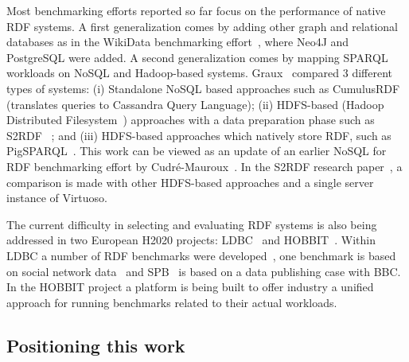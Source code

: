 Most benchmarking efforts reported so far focus on the performance of native RDF systems. A first generalization comes by adding other graph and relational databases as in the WikiData benchmarking effort~\cite{hernandez2016querying}, where Neo4J and PostgreSQL were added. A second generalization comes by mapping SPARQL workloads on NoSQL and Hadoop-based systems. Graux~\cite{graux2016multi} compared 3 different types of systems: (i) Standalone NoSQL based approaches such as CumulusRDF~\cite{ladwig2011cumulusrdf} (translates queries to Cassandra Query Language); (ii) HDFS-based (Hadoop Distributed Filesystem~\cite{ghemawat2003google}) approaches with a data preparation phase such as S2RDF~\cite{Schatzle:2016:SRQ:2977797.2977806} ; and (iii) HDFS-based approaches which natively store RDF, such as PigSPARQL~\cite{schatzle2011pigsparql}. This work can be viewed as an update of an earlier NoSQL for RDF benchmarking effort by Cudr{\'e}-Mauroux~\cite{cudre2013nosql}. 
In the S2RDF research paper~\cite{Schatzle:2016:SRQ:2977797.2977806}, a comparison is made with other HDFS-based approaches and a single server instance of Virtuoso.

The current difficulty in selecting and evaluating RDF systems is also being addressed in two European H2020 projects: LDBC~\cite{LDBC} and 
HOBBIT~\cite{HOBBIT}. Within LDBC a number of RDF benchmarks were developed~\cite{Boncz:2013:LBG:2513591.2527070}, one benchmark is based on social network data~\cite{erling2015ldbc} and SPB~\cite{kotsevbenchmarking} is based on a data publishing case with BBC. 
In the HOBBIT project a platform is being built to offer industry a unified approach for running benchmarks related to their actual workloads.



\subsection{Positioning this work}


